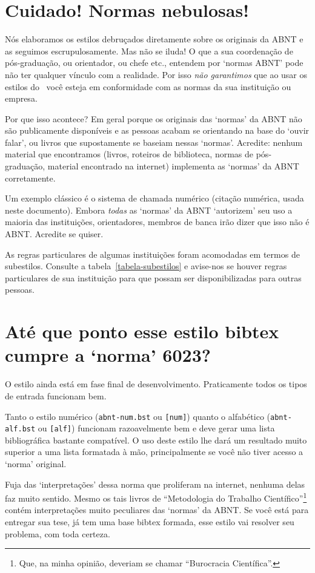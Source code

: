 \documentclass[espacosimples]{abnt}
\begin{document}
\section{Cuidado! Normas nebulosas!}

Nós elaboramos os estilos debruçados diretamente sobre os originais da ABNT
e as seguimos escrupulosamente. Mas não se iluda! O que a sua coordenação
de pós-graduação, ou orientador, ou chefe etc., entendem por `normas ABNT'
pode não ter qualquer vínculo com a realidade. Por isso \emph{não garantimos}
que ao usar os estilos do \abnTeX\ você esteja em conformidade com as normas
da sua instituição ou empresa.

Por que isso acontece? Em geral porque os originais das `normas' da ABNT não
são publicamente disponíveis e as pessoas acabam se orientando na base do
`ouvir falar', ou livros que supostamente se baseiam nessas `normas'.
Acredite: nenhum material que encontramos (livros, roteiros de biblioteca,
normas de pós-graduação, material encontrado na internet) implementa
as `normas' da ABNT corretamente.

Um exemplo clássico é o sistema de chamada numérico (citação numérica, usada neste
documento). Embora \emph{todas} as `normas' da ABNT\cite{NBR6023:2000,NBR10520:1988,NBR10520:2001}
`autorizem' seu uso a maioria das instituições, orientadores, membros de banca
irão dizer que isso não é ABNT. Acredite se quiser.

As regras particulares de algumas instituições foram acomodadas em termos de subestilos.
Consulte a tabela~\ref{tabela-subestilos} e avise-nos se houver regras
particulares de sua instituição para que possam ser disponibilizadas para outras
pessoas.

\section{Até que ponto esse estilo bibtex cumpre a `norma' 6023?}

O estilo ainda está em fase final de desenvolvimento. Praticamente
todos os tipos de entrada funcionam bem.

Tanto o estilo numérico ({\tt abnt-num.bst} ou {\tt [num]})
quanto o alfabético ({\tt abnt-alf.bst} ou {\tt [alf]})
funcionam razoavelmente bem e deve
gerar uma lista bibliográfica bastante compatível.
O uso deste estilo lhe dará um resultado muito superior
a uma lista formatada à mão, principalmente se você não tiver acesso
a `norma' original\cite{NBR6023:2000}.

Fuja das `interpretações' dessa norma que proliferam na internet, nenhuma
delas faz muito sentido. Mesmo os tais livros de ``Metodologia do Trabalho
Científico''\footnote{Que, na minha opinião, deveriam se chamar ``Burocracia Científica''.}
contém interpretações muito peculiares das `normas' da ABNT.
Se você está para entregar sua tese, já tem uma base bibtex formada,
esse estilo vai resolver seu problema, com toda certeza.
\end{document}
